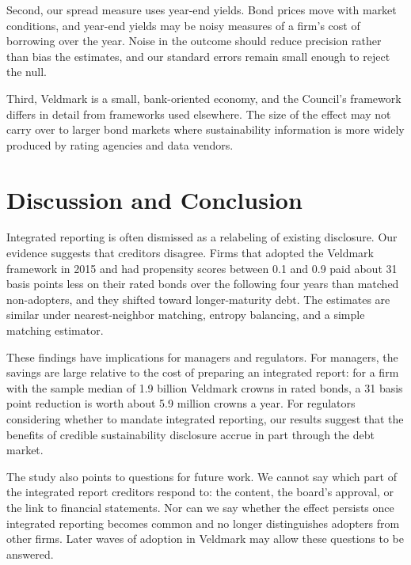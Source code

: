 \documentclass[11pt]{article}
\begin{document}
Second, our spread measure uses year-end yields. Bond prices move with market conditions, and year-end yields may be noisy measures of a firm's cost of borrowing over the year. Noise in the outcome should reduce precision rather than bias the estimates, and our standard errors remain small enough to reject the null.

Third, Veldmark is a small, bank-oriented economy, and the Council's framework differs in detail from frameworks used elsewhere. The size of the effect may not carry over to larger bond markets where sustainability information is more widely produced by rating agencies and data vendors.

\section{Discussion and Conclusion}

Integrated reporting is often dismissed as a relabeling of existing disclosure. Our evidence suggests that creditors disagree. Firms that adopted the Veldmark framework in 2015 and had propensity scores between 0.1 and 0.9 paid about 31 basis points less on their rated bonds over the following four years than matched non-adopters, and they shifted toward longer-maturity debt. The estimates are similar under nearest-neighbor matching, entropy balancing, and a simple matching estimator.

These findings have implications for managers and regulators. For managers, the savings are large relative to the cost of preparing an integrated report: for a firm with the sample median of 1.9 billion Veldmark crowns in rated bonds, a 31 basis point reduction is worth about 5.9 million crowns a year. For regulators considering whether to mandate integrated reporting, our results suggest that the benefits of credible sustainability disclosure accrue in part through the debt market.

The study also points to questions for future work. We cannot say which part of the integrated report creditors respond to: the content, the board's approval, or the link to financial statements. Nor can we say whether the effect persists once integrated reporting becomes common and no longer distinguishes adopters from other firms. Later waves of adoption in Veldmark may allow these questions to be answered.
\end{document}
